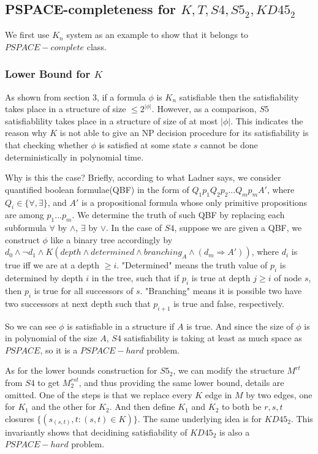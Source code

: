 \documentclass{article}
\begin{document}
\subsection{PSPACE-completeness for $K,T,S4,S5_2, KD45_2$}
\par We first use $K_n$ system as an example to show that it belongs to $PSPACE-complete$ class.
\subsubsection{Lower Bound for $K$}
\par As shown from section 3, if a formula $\phi$ is $K_n$ satisfiable then the satisfiability takes place in a structure of size $\leq 2^{|\phi|}$. However, as a comparison, $S5$ satisfiablility takes place in a structure of size of at most $|\phi|$. This indicates the reason why $K$ is not able to give an NP decision procedure for its satisfiability is that checking whether $\phi$ is satisfied at some state $s$ cannot be done deterministically in polynomial time.
\par Why is this the case? Briefly, according to what Ladner says, we consider quantified boolean formulae(QBF) in the form of $Q_1p_1Q_2p_2...Q_mp_mA'$, where $Q_i \in \{\forall,\exists\}$, and $A'$ is a propositional formula whose only primitive propositions are among $p_1...p_m$. We determine the truth of such QBF by replacing each subformula $\forall$ by $\land$, $\exists$ by $\lor$. In the case of $S4$, suppose we are given a QBF, we construct $\phi$ like a binary tree accordingly by $d_0\land\lnot d_1\land K(depth\land determined \land branching_A \land (d_m\Rightarrow A'))$, where $d_i$ is true iff we are at a depth $\geq i$. "Determined" means the truth value of $p_i$ is determined by depth $i$ in the tree, such that if $p_i$ is true at depth $j \geq i$ of node $s$, then $p_i$ is true for all successors of $s$. "Branching" means it is possible two have two successors at next depth such that $p_{i+1}$ is true and false, respectively. 
\par So we can see $\phi$ is satisfiable in a structure if $A$ is true. And since the size of $\phi$ is in polynomial of the size $A$, $S4$ satisfiability is taking at least as much space as $PSPACE$, so it is a $PSPACE-hard$ problem.
\par As for the lower bounds construction for $S5_2$, we can modify the structure $M^{rt}$ from $S4$ to get $M_2^{rst}$, and thus providing the same lower bound, details are omitted. One of the steps is that we replace every $K$ edge in $M$ by two edges, one for $K_1$ and the other for $K_2$. And then define $K_1$ and $K_2$ to both be $r,s,t$ closures $\{(s_{(s,t)},t: (s,t)\in K)\}$. The same underlying idea is for $KD45_2$. This invariantly shows that decidining satisfiability of $KD45_2$ is also a $PSPACE-hard$ problem.
\end{document}
